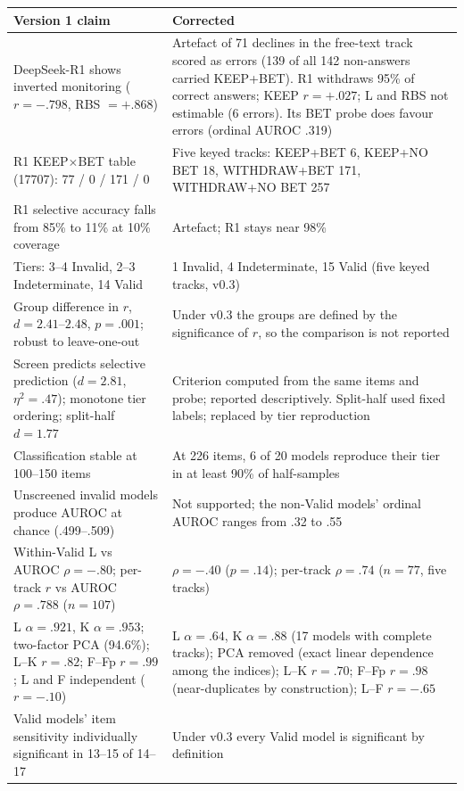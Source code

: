 \documentclass[11pt,a4paper]{article}
\begin{document}
\begin{center}
\small
\begin{tabular}{p{6.6cm} p{7.8cm}}
\toprule
Version 1 claim & Corrected \\
\midrule
DeepSeek-R1 shows inverted monitoring ($r = -.798$, RBS $= +.868$) & Artefact of 71 declines in the free-text track scored as errors (139 of all 142 non-answers carried KEEP+BET). R1 withdraws 95\% of correct answers; KEEP $r = +.027$; L and RBS not estimable (6 errors). Its BET probe does favour errors (ordinal AUROC .319) \\
R1 KEEP$\times$BET table (17707): 77 / 0 / 171 / 0 & Five keyed tracks: KEEP+BET 6, KEEP+NO BET 18, WITHDRAW+BET 171, WITHDRAW+NO BET 257 \\
R1 selective accuracy falls from 85\% to 11\% at 10\% coverage & Artefact; R1 stays near 98\% \\
Tiers: 3--4 Invalid, 2--3 Indeterminate, 14 Valid & 1 Invalid, 4 Indeterminate, 15 Valid (five keyed tracks, v0.3) \\
Group difference in $r$, $d = 2.41$--$2.48$, $p = .001$; robust to leave-one-out & Under v0.3 the groups are defined by the significance of $r$, so the comparison is not reported \\
Screen predicts selective prediction ($d = 2.81$, $\eta^2 = .47$); monotone tier ordering; split-half $d = 1.77$ & Criterion computed from the same items and probe; reported descriptively. Split-half used fixed labels; replaced by tier reproduction \\
Classification stable at 100--150 items & At 226 items, 6 of 20 models reproduce their tier in at least 90\% of half-samples \\
Unscreened invalid models produce AUROC at chance (.499--.509) & Not supported; the non-Valid models' ordinal AUROC ranges from .32 to .55 \\
Within-Valid L vs AUROC $\rho = -.80$; per-track $r$ vs AUROC $\rho = .788$ ($n = 107$) & $\rho = -.40$ ($p = .14$); per-track $\rho = .74$ ($n = 77$, five tracks) \\
L $\alpha = .921$, K $\alpha = .953$; two-factor PCA (94.6\%); L--K $r = .82$; F--Fp $r = .99$; L and F independent ($r = -.10$) & L $\alpha = .64$, K $\alpha = .88$ (17 models with complete tracks); PCA removed (exact linear dependence among the indices); L--K $r = .70$; F--Fp $r = .98$ (near-duplicates by construction); L--F $r = -.65$ \\
Valid models' item sensitivity individually significant in 13--15 of 14--17 & Under v0.3 every Valid model is significant by definition \\

\end{tabular}
\end{center}
\end{document}
